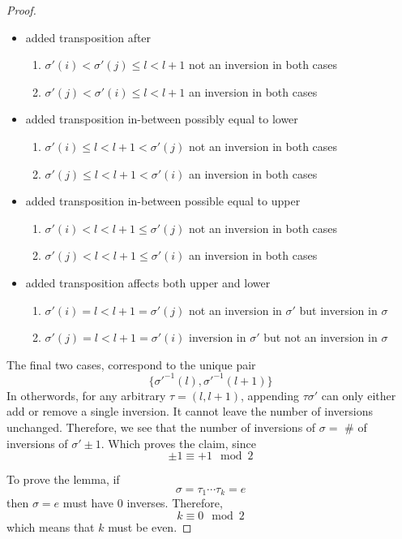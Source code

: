\documentclass{article}
\begin{document}
\begin{proof}
\begin{description}
\begin{itemize}
            \item added transposition after
            \begin{enumerate}[resume, label=(\arabic*)]
                \item $\sigma'(i) < \sigma'(j) \leq l < l + 1$ not an inversion in both cases
                \item $\sigma'(j) < \sigma'(i) \leq l < l + 1$ an inversion in both cases
            \end{enumerate}

            \item added transposition in-between possibly equal to lower 
            \begin{enumerate}[resume, label=(\arabic*)]
                \item $\sigma'(i) \leq l < l + 1 < \sigma'(j)$ not an inversion in both cases
                \item $\sigma'(j) \leq l < l + 1 < \sigma'(i)$ an inversion in both cases
            \end{enumerate}
            
            \item added transposition in-between possible equal to upper
            \begin{enumerate}[resume, label=(\arabic*)]
                \item $\sigma'(i) < l < l + 1 \leq \sigma'(j)$ not an inversion in both cases
                \item $\sigma'(j) < l < l + 1 \leq \sigma'(i)$ an inversion in both cases
            \end{enumerate}

            \item added transposition affects both upper and lower
            \begin{enumerate}[resume, label=(\arabic*)]
                \item $\sigma'(i) = l < l + 1 = \sigma'(j)$ not an inversion in $\sigma'$ but inversion in $\sigma$
                \item $\sigma'(j) = l < l + 1 = \sigma'(i)$ inversion in $\sigma'$ but not an inversion in $\sigma$
            \end{enumerate}
        \end{itemize}
        The final two cases, correspond to the unique pair
        \[
            \{\sigma'^{-1}(l), \sigma'^{-1}(l + 1)\}  
        \]
        In otherwords, for any arbitrary $\tau = (l, l+1)$, appending $\tau\sigma'$ can only either add or remove a single inversion.
        It cannot leave the number of inversions unchanged. 
        Therefore, we see that the number of inversions of $\sigma = $ \# of inversions of $\sigma' \pm 1$. Which proves the claim, since 
        \[
            \pm 1 \equiv + 1 \mod 2
        \]
    \end{description}
    To prove the lemma, if 
    \[
        \sigma = \tau_1 \cdots \tau_k = e  
    \]
    then $\sigma = e$ must have $0$ inverses. Therefore,
    \[
        k \equiv 0 \mod 2  
    \]
    which means that $k$ must be even.
\end{proof}
\end{document}
